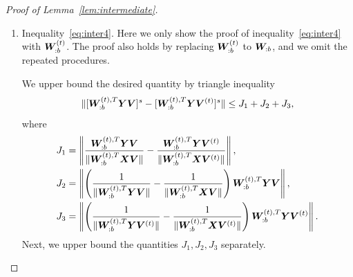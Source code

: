 \documentclass[journal]{IEEEtran}
\theoremstyle{definition}
\theoremstyle{definition}
\newcommand{\of}[1]{\left(#1\right)}
\begin{document}
\begin{proof}[Proof of Lemma~\ref{lem:intermediate}]
\begin{enumerate}[wide]
     
    Hence, combining inequalities~\eqref{eq:i11} and~\eqref{eq:i12} yields  
    \begin{equation}\label{eq:i1}
        I_1 \lesssim \frac{r L^{(t)}}{\Delta_{\min}} + \sqrt{\frac{ r^{2K} + p r^{K+1}}{p^K}} \frac{\sqrt{L^{(t)}}}{\Delta_{\min}}.
    \end{equation}
    
        For $I_2$ and $I_3$, recall that $\onorm{\mW_{:b}^T \mX \mV} = \onorm{\mS_{b:}} \geq c_3$ and $\onormSize{}{  \mW_{:b}^{(t),T} \mX \mV } \geq C_1$ by inequality~\eqref{eq:i11_sin_dom}. By triangle inequality and \eqref{eq:cond1} in Condition~\ref{cond:origin}, we have 
    \begin{equation}\label{eq:i2}
         I_2 \leq \frac{ \onormSize{}{ \mW_{:b}^T \mE \mV } }{ \onormSize{}{\mW_{:b}^T \mX \mV}  } \lesssim  \onormSize{}{ \mW_{:b}^T \mE \mV }  \lesssim \frac{r^K}{p^{K/2}},
    \end{equation}
    and 
    \begin{equation}\label{eq:i3}
        I_3 \leq \frac{ \onormSize{}{ \mW_{:b}^{(t),T} \mE \mV } }{ \onormSize{}{\mW_{:b}^{(t),T} \mX \mV}  }  \lesssim \onormSize{}{ \mW_{:b}^{(t),T} \mE \mV } \lesssim \frac{r^K}{p^{K/2}}.
     \end{equation}
       Therefore, combining the inequalities~\eqref{eq:i1}, \eqref{eq:i2}, and \eqref{eq:i3}, we finish the proof of inequality~\eqref{eq:inter3}.
    
    \item Inequality~\eqref{eq:inter4}. Here we only show the proof of inequality~\eqref{eq:inter4} with $\bm{W}_{:b}^{(t)}$. The proof also holds by replacing $\bm{W}_{:b}^{(t)}$ to $\bm{W}_{:b}$, and we omit the repeated procedures.
    
    We upper bound the desired quantity by triangle inequality
    \begin{equation}
         \lVert  [   \bm{W}_{:b}^{(t), T}  \bm Y \bm{V}]^s -  [  \bm{W}_{:b}^{(t), T}  \bm Y \bm{V}^{(t)}]^s \rVert  \leq J_1 + J_2 + J_3,
    \end{equation}
    where 
    \small
    \begin{align}
        J_1 &= \onorm{ \frac{\mW_{:b}^{(t),T} \mY \mV }{\onormSize{}{ \mW_{:b}^{(t),T} \mX \mV }} - \frac{\mW_{:b}^{(t),T} \mY \mV^{(t)} }{\onormSize{}{ \mW_{:b}^{(t),T} \mX \mV^{(t)} }}  },\\
        J_2 & = \onorm{\of{ \frac{1}{\onormSize{}{\mW_{:b}^{(t),T} \mY \mV}} -  \frac{1}{\onormSize{}{\mW_{:b}^{(t),T} \mX \mV}}  } \mW_{:b}^{(t),T} \mY \mV },\\
        J_3 &= \onorm{\of{ \frac{1}{\onormSize{}{\mW_{:b}^{(t),T} \mY \mV^{(t)}}} -  \frac{1}{\onormSize{}{\mW_{:b}^{(t),T} \mX \mV^{(t)}} }  } \mW_{:b}^{(t), T} \mY \mV^{(t)} }.
    \end{align}
    \normalsize
    Next, we upper bound the quantities $J_1, J_2, J_3$ separately. 


\end{enumerate}
\end{proof}
\end{document}
